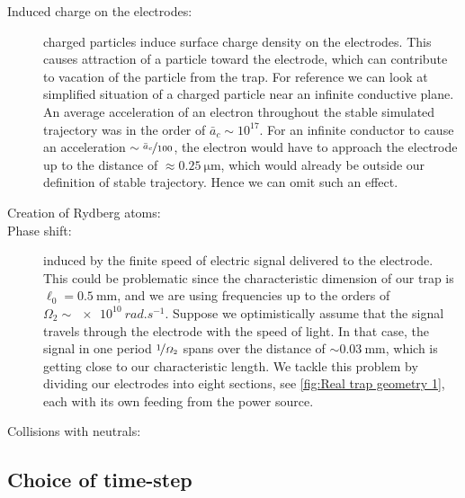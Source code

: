 \begin{description}
	\item[Induced charge on the electrodes:] charged particles induce surface charge density on the electrodes. This causes attraction of a particle toward the electrode, which can contribute to vacation of the particle from the trap. For reference we can look at simplified situation of a charged particle near an infinite conductive plane. An average acceleration of an electron throughout the stable simulated trajectory was in the order of $\bar{a}_c \sim 10^{17}$. For an infinite conductor to cause an acceleration $\sim \nicefrac{\bar{a}_c}{100}$, the electron would have to approach the electrode up to the distance of $\approx \SI{0.25}{\micro\meter}$, which would already be outside our definition of stable trajectory. Hence we can omit such an effect. 
	\item[Creation of Rydberg atoms:] 
	\item[Phase shift:] induced by the finite speed of electric signal delivered to the electrode. This could be problematic since the characteristic dimension of our trap is $\ell_0 = \SI{0.5}{\mm}$, and we are using frequencies up to the orders of $\Omega_2 \sim \SI{e10}{rad.s^{-1}}$. Suppose we optimistically assume that the signal travels through the electrode with the speed of light. In that case, the signal in one period $\nicefrac{1}{\Omega_2}$ spans over the distance of $\sim \SI{0.03}{\mm}$, which is getting close to our characteristic length. We tackle this problem by dividing our electrodes into eight sections, see \ref{fig:Real trap geometry 1}, each with its own feeding from the power source.
	\item[Collisions with neutrals:] 
\end{description}	


\subsection{Choice of time-step}

